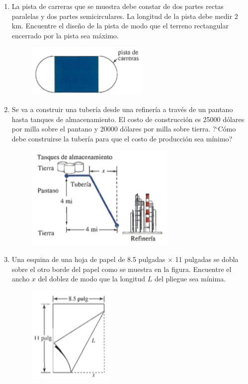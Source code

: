 \documentclass[11pt,a4paper,oneside]{article}\usepackage[]{graphicx}\usepackage[]{color}
\begin{document}
\begin{enumerate}
      \item La pista de carreras que se muestra debe constar de dos partes rectas paralelas y dos partes semicirculares. La longitud de la pista debe medir 2 km. Encuentre el diseño de la pista de modo que el terreno rectangular encerrado por la pista sea máximo.
      
      \begin{figure}[H]
      \centering
      \includegraphics[scale=.7]{images/fig03.png}
      \end{figure}
      
      \item Se va a construir una tubería desde una refinería  a través de un pantano hasta tanques de almacenamiento. El costo de construcción es 25000 dólares por milla sobre el pantano y 20000 dólares por milla sobre tierra. ?`Cómo debe construirse la tubería para que el costo de producción sea mínimo?
      
      \begin{figure}[H]
      \centering
      \includegraphics[scale=.7]{images/fig04.png}
      \end{figure}
      
      \item Una esquina de una hoja de papel de 8.5 pulgadas $\times$ 11 pulgadas se dobla sobre el otro  borde del papel como se muestra en la figura. Encuentre el ancho $x$ del doblez de modo que la longitud $L$ del pliegue sea mínima.
      
      \begin{figure}[H]
      \centering
      \includegraphics[scale=.7]{images/fig05.png}
      \end{figure}
      
\end{enumerate}
\end{document}
